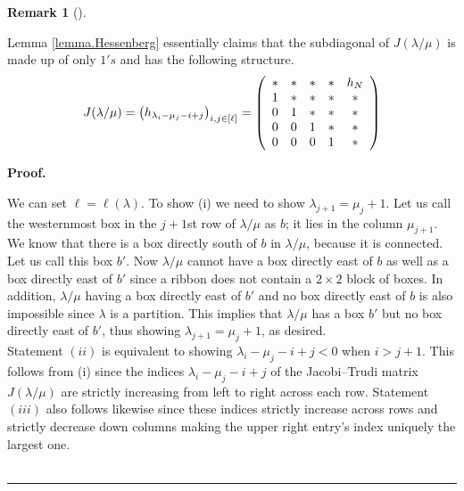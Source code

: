 \documentclass[numbers=enddot,12pt,final,onecolumn,notitlepage]{scrartcl}%
\theoremstyle{definition}
\newtheorem{remk}[theo]{Remark}
\newenvironment{remark}[1][]
{\begin{remk}[#1]\begin{leftbar}}
{\end{leftbar}\end{remk}}
\newenvironment{proof}[1][Proof]{\noindent\textbf{#1.} }{\ \rule{0.5em}{0.5em}}
\theoremstyle{plainsl}
\begin{document}
\begin{remark}
Lemma \ref{lemma.Hessenberg} essentially claims that the subdiagonal of $J(\lambda / \mu)$ is made up of only $1's$ and has the following structure. 
\[
J(\lambda / \mu) = \left(  h_{\lambda_{i}-\mu_{j}-i+j}\right)  _{i,j\in\left[  \ell\right]
}=\left(
\begin{array}
[c]{ccccc}%
\ast & \ast & \ast & \ast & h_{N}\\
1 & \ast & \ast & \ast & \ast\\
0 & 1 & \ast & \ast & \ast\\
0 & 0 & 1 & \ast & \ast\\
0 & 0 & 0 & 1 & \ast
\end{array}
\right)   
\]
\end{remark}

\begin{proof}




We can set $\ell=\ell\left(\lambda\right)$. To show (i) we need to show $\lambda_{j+1}=\mu_{j}+1$. Let us call the westernmost box in the $j+1$st row of $\lambda/\mu$ as $b$; it lies in the column $\mu_{j+1}$. We know that there is a box directly south of $b$ in $\lambda/\mu$, because it is connected. Let us call this box $b'$. Now $\lambda/\mu$ cannot have a box directly east of $b$ as well as a box directly east of $b'$ since a ribbon does not contain a $2\times2$ block of boxes. In addition, $\lambda/\mu$ having a box directly east of $b'$ and no box directly east of $b$ is also impossible since $\lambda$ is a partition. This implies that $\lambda/\mu$ has a box $b'$ but no box directly east of $b'$, thus showing $\lambda_{j+1}=\mu_{j}+1$, as desired.\\


Statement $(ii)$ is equivalent to showing $\lambda_{i}-\mu_{j}-i+j < 0$ when $i > j+1$. This follows from (i) since the indices $\lambda_{i}-\mu_{j}-i+j$ of the Jacobi--Trudi matrix $J(\lambda / \mu)$  are strictly increasing from left to right across each row. Statement $(iii)$ also follows likewise since these indices strictly increase across rows and strictly decrease down columns making the upper right entry's index uniquely the largest one.\\




\end{proof}
\end{document}
